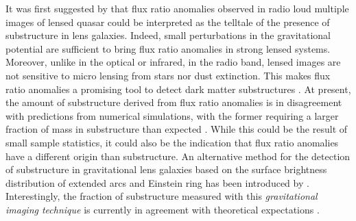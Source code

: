 \documentclass[useAMS,usenatbib]{mn2e}
\begin{document}
It was first suggested by \citet{Mao1998} that flux ratio anomalies observed in radio loud multiple images of lensed quasar could be interpreted as the telltale of the presence of substructure in lens galaxies.
Indeed, small perturbations in the gravitational potential are
sufficient to bring flux ratio anomalies in strong lensed systems.
Moreover, unlike in the optical or infrared, in the radio band, lensed
images are not sensitive to micro lensing from stars nor dust
extinction.  This makes flux ratio anomalies a promising tool to
detect dark matter substructures \citep{Dalal2002, N13}.  At present,
the amount of substructure derived from flux ratio anomalies is in
disagreement with predictions from numerical simulations, with the
former requiring a larger fraction of mass in substructure than
expected \citet{Xu14}. While this could be the result of small sample
statistics, it could also be the indication that flux ratio anomalies
have a different origin than substructure. 
%
An alternative method for
the detection of substructure in gravitational lens galaxies based on
the surface brightness distribution of extended arcs and Einstein ring
has been introduced by \citet{K05,V09}. Interestingly, the fraction of
substructure measured with this \emph{gravitational imaging technique}
is currently in agreement with theoretical expectations \citep{V14a}.
\end{document}
